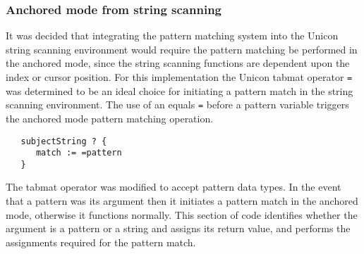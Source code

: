 \documentclass{article}
\begin{document}
\subsubsection{Anchored mode from string scanning}
It was decided that integrating the pattern matching system into the Unicon string scanning environment would require the pattern matching be performed in the anchored mode, since the string scanning functions are dependent upon the index or cursor position.  For this implementation the Unicon tabmat operator \texttt{=} was determined to be an ideal choice for initiating a pattern match in the string scanning environment.  The use of an equals \texttt{=} before a pattern variable triggers the anchored mode pattern matching operation.
 
\begin{verbatim}
   subjectString ? {
      match := =pattern
   }
\end{verbatim}

The tabmat operator was modified to accept pattern data types.  In the event that a pattern was its argument then it initiates a pattern match in the anchored mode, otherwise it functions normally.  This section of code identifies whether the argument is a pattern or a string and assigns its return value, and performs the assignments required for the pattern match.
\end{document}
